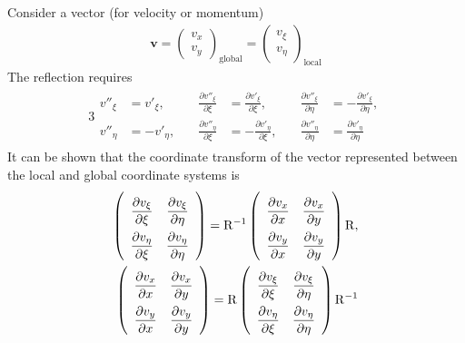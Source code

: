 \documentclass[a4paper,12pt,dvips]{article}
\begin{document}
Consider a vector (for velocity or momentum)
\begin{align*}
\mathbf{v} = \left(\begin{array}{c}
  v_x \\ v_y
\end{array}\right)_{\text{global}}
= \left(\begin{array}{c}
  v_{\xi} \\ v_{\eta}
\end{array}\right)_{\text{local}}
\end{align*}
The reflection requires
\begin{alignat}{3}
\begin{aligned}
  v''_{\xi}
  &= v'_{\xi}, \quad
  &\frac{\partial v''_{\xi}}{\partial\xi}
  &= \frac{\partial v'_{\xi}}{\partial\xi}, \quad
  &\frac{\partial v''_{\xi}}{\partial\eta}
  &= -\frac{\partial v'_{\xi}}{\partial\eta}, \\
  v''_{\eta}
  &= -v'_{\eta}, \quad
  &\frac{\partial v''_{\eta}}{\partial\xi}
  &= -\frac{\partial v'_{\eta}}{\partial\xi}, \quad
  &\frac{\partial v''_{\eta}}{\partial\eta}
  &= \frac{\partial v'_{\eta}}{\partial\eta}
\end{aligned} \label{e:reflection_vec}
\end{alignat}
It can be shown that the coordinate transform of the vector represented between
the local and global coordinate systems is
\begin{align}
\begin{aligned}
\renewcommand{\arraystretch}{2.2}
\left(\begin{array}{cc}
  \dfrac{\partial v_{\xi}}{\partial\xi} &
  \dfrac{\partial v_{\xi}}{\partial\eta} \\
  \dfrac{\partial v_{\eta}}{\partial\xi} &
  \dfrac{\partial v_{\eta}}{\partial\eta}
\end{array}\right)
= \mathrm{R}^{-1}
\left(\begin{array}{cc}
  \dfrac{\partial v_x}{\partial x} &
  \dfrac{\partial v_x}{\partial y} \\
  \dfrac{\partial v_y}{\partial x} &
  \dfrac{\partial v_y}{\partial y}
\end{array}\right)
\mathrm{R}, \\
\renewcommand{\arraystretch}{2.2}
\left(\begin{array}{cc}
  \dfrac{\partial v_x}{\partial x} &
  \dfrac{\partial v_x}{\partial y} \\
  \dfrac{\partial v_y}{\partial x} &
  \dfrac{\partial v_y}{\partial y}
\end{array}\right)
= \mathrm{R}
\left(\begin{array}{cc}
  \dfrac{\partial v_{\xi}}{\partial\xi} &
  \dfrac{\partial v_{\xi}}{\partial\eta} \\
  \dfrac{\partial v_{\eta}}{\partial\xi} &
  \dfrac{\partial v_{\eta}}{\partial\eta}
\end{array}\right)
\mathrm{R}^{-1}
\end{aligned} \label{e:reflection_vec_trans}
\end{align}
\end{document}
